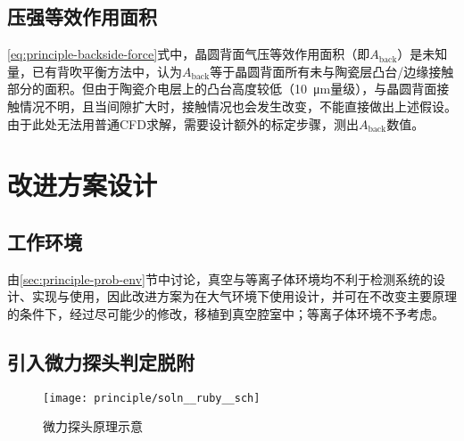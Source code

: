 \clearpage


\subsection{压强等效作用面积}\label{principle-prob-area}

\eqref{eq:principle-backside-force}式中，晶圆背面气压等效作用面积（即$A_{\mathrm{back}}$）是未知量，已有背吹平衡方法中，认为$A_{\mathrm{back}}$等于晶圆背面所有未与陶瓷层凸台/边缘接触部分的面积\cite{RefWorks:43}。但由于陶瓷介电层上的凸台高度较低（\SI{10}{\um}量级），与晶圆背面接触情况不明，且当间隙扩大时，接触情况也会发生改变，不能直接做出上述假设。由于此处无法用普通CFD求解，需要设计额外的标定步骤，测出$A_{\mathrm{back}}$数值。



\section{改进方案设计}\label{principle-soln}


\subsection{工作环境}\label{principle-soln-env}

由\ref{sec:principle-prob-env}节中讨论，真空与等离子体环境均不利于检测系统的设计、实现与使用，因此改进方案为在大气环境下使用设计，并可在不改变主要原理的条件下，经过尽可能少的修改，移植到真空腔室中；等离子体环境不予考虑。


\subsection{引入微力探头判定脱附}\label{principle-soln-ruby}

\begin{figure}[tbhp]
\centering
\texttt{[image: principle/soln\_\_ruby\_\_sch]}
\caption{微力探头原理示意}
\label{fig:principle-soln-ruby-sch}
\end{figure}

